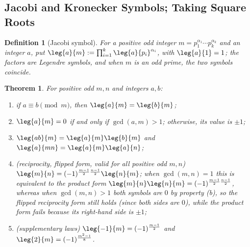 \documentclass[11pt]{article}
\theoremstyle{ntstyle}
\newtheorem{theorem}{Theorem}[subsection]
\newtheorem{definition}{Definition}[subsection]
\begin{document}
\subsection{Jacobi and Kronecker Symbols; Taking Square Roots}

\begin{definition}[Jacobi symbol]\label{def:7.6.1} For a positive
	odd integer $m = p_1^{\alpha_1} \cdots p_k^{\alpha_k}$ and an integer
	$a$, put $\leg{a}{m} := \prod_{i=1}^{k}\leg{a}{p_i}^{\alpha_i}$, with $\leg{a}{1} = 1$; the
	factors are Legendre symbols, and when $m$ is an odd prime, the two symbols coincide.

\end{definition}
\begin{theorem}\label{thm:7.6.1}
	For positive odd $m, n$ and integers $a, b$:

	\begin{enumerate}[label={\alph*)}]
		\item if $a \equiv b \pmod{m}$, then $\leg{a}{m} =
			      \leg{b}{m}$;
		\item $\leg{a}{m} = 0$ if and only if $\gcd(a, m) > 1$; otherwise, its value is $\pm 1$;
		\item $\leg{ab}{m} = \leg{a}{m}\leg{b}{m}$ and $\leg{a}{mn} = \leg{a}{m}\leg{a}{n}$;
		\item (reciprocity, flipped form, valid for all positive odd $m, n$)
		      $\leg{m}{n} = (-1)^{\frac{m-1}{2}\frac{n-1}{2}}\leg{n}{m}$; when
		      $\gcd(m, n) = 1$ this is equivalent to the product form
		      $\leg{m}{n}\leg{n}{m} = (-1)^{\frac{m-1}{2}\frac{n-1}{2}}$, whereas
		      when $\gcd(m, n) > 1$ both symbols are $0$ by property (b), so the flipped reciprocity form still holds (since both sides are $0$), while the product form fails because its right-hand side is $\pm 1$;
		\item (supplementary laws) $\leg{-1}{m} =
			      (-1)^{\frac{m-1}{2}}$ and $\leg{2}{m} = (-1)^{\frac{m^2-1}{8}}$.
	\end{enumerate}

\end{theorem}
\end{document}
